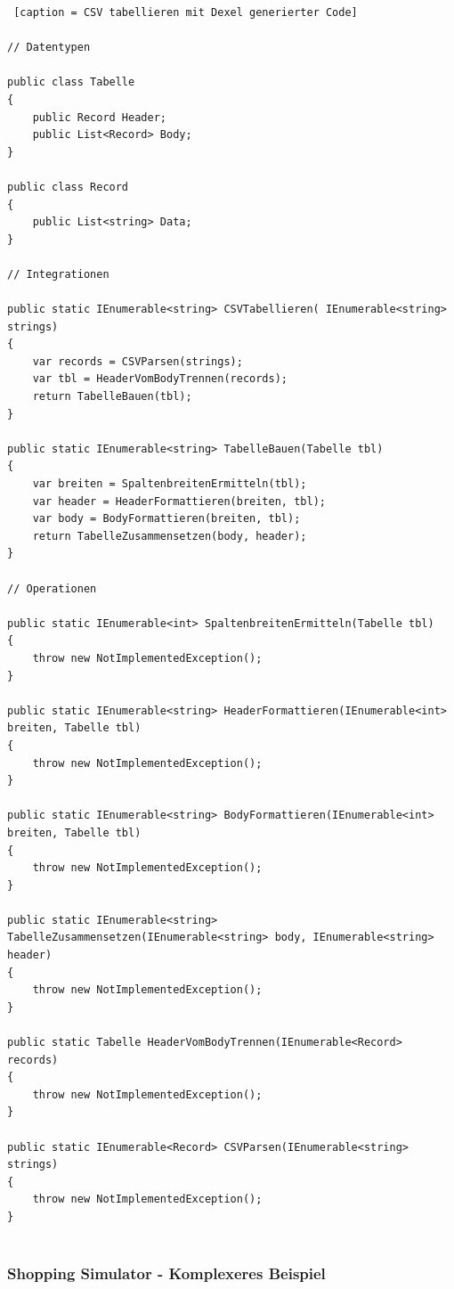 \begin{lstlisting} [caption = CSV tabellieren mit Dexel generierter Code]

// Datentypen

public class Tabelle
{
    public Record Header;
    public List<Record> Body;
}

public class Record
{
    public List<string> Data;
}

// Integrationen

public static IEnumerable<string> CSVTabellieren( IEnumerable<string> strings)
{
	var records = CSVParsen(strings);
	var tbl = HeaderVomBodyTrennen(records);
	return TabelleBauen(tbl);
}

public static IEnumerable<string> TabelleBauen(Tabelle tbl)
{
	var breiten = SpaltenbreitenErmitteln(tbl);
	var header = HeaderFormattieren(breiten, tbl);
	var body = BodyFormattieren(breiten, tbl);
	return TabelleZusammensetzen(body, header);
}

// Operationen

public static IEnumerable<int> SpaltenbreitenErmitteln(Tabelle tbl)
{
    throw new NotImplementedException();
}

public static IEnumerable<string> HeaderFormattieren(IEnumerable<int> breiten, Tabelle tbl)
{
    throw new NotImplementedException();
}

public static IEnumerable<string> BodyFormattieren(IEnumerable<int> breiten, Tabelle tbl)
{
    throw new NotImplementedException();
}

public static IEnumerable<string> TabelleZusammensetzen(IEnumerable<string> body, IEnumerable<string> header)
{
    throw new NotImplementedException();
}

public static Tabelle HeaderVomBodyTrennen(IEnumerable<Record> records)
{
    throw new NotImplementedException();
}

public static IEnumerable<Record> CSVParsen(IEnumerable<string> strings)
{
    throw new NotImplementedException();
}


\end{lstlisting}

\subsubsection{Shopping Simulator - Komplexeres Beispiel}

